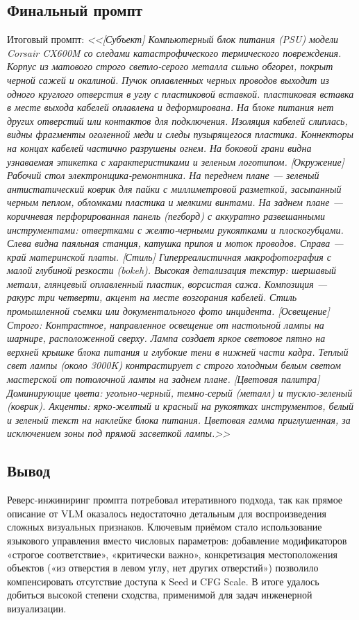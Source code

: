 \subsection{Финальный промпт}
Итоговый промпт: \textit{<<[Субъект]
Компьютерный блок питания (PSU) модели Corsair CX600M со следами катастрофического термического повреждения. Корпус из матового строго светло-серого металла сильно обгорел, покрыт черной сажей и окалиной. Пучок оплавленных черных проводов выходит из одного круглого отверстия в углу с пластиковой вставкой. пластиковая вставка в месте выхода кабелей оплавлена и деформирована. На блоке питания нет других отверстий или контактов для подключения. Изоляция кабелей слиплась, видны фрагменты оголенной меди и следы пузырящегося пластика. Коннекторы на концах кабелей частично разрушены огнем. На боковой грани видна узнаваемая этикетка с характеристиками и зеленым логотипом.
[Окружение]
Рабочий стол электронщика-ремонтника. На переднем плане — зеленый антистатический коврик для пайки с миллиметровой разметкой, засыпанный черным пеплом, обломками пластика и мелкими винтами. На заднем плане — коричневая перфорированная панель (пегборд) с аккуратно развешанными инструментами: отвертками с желто-черными рукоятками и плоскогубцами. Слева видна паяльная станция, катушка припоя и моток проводов. Справа — край материнской платы.
[Стиль]
Гиперреалистичная макрофотография с малой глубиной резкости (bokeh). Высокая детализация текстур: шершавый металл, глянцевый оплавленный пластик, ворсистая сажа. Композиция — ракурс три четверти, акцент на месте возгорания кабелей. Стиль промышленной съемки или документального фото инцидента.
[Освещение]
Строго: Контрастное, направленное освещение от настольной лампы на шарнире, расположенной сверху. Лампа создает яркое световое пятно на верхней крышке блока питания и глубокие тени в нижней части кадра. Теплый свет лампы (около 3000K) контрастирует с строго холодным белым светом мастерской от потолочной лампы на заднем плане.
[Цветовая палитра]
Доминирующие цвета: угольно-черный, темно-серый (металл) и тускло-зеленый (коврик). Акценты: ярко-желтый и красный на рукоятках инструментов, белый и зеленый текст на наклейке блока питания. Цветовая гамма приглушенная, за исключением зоны под прямой засветкой лампы.>>}
\subsection{Вывод}
Реверс-инжиниринг промпта потребовал итеративного подхода, так как прямое описание от VLM оказалось недостаточно детальным для воспроизведения сложных визуальных признаков. Ключевым приёмом стало использование языкового управления вместо числовых параметров: добавление модификаторов «строгое соответствие», «критически важно», конкретизация местоположения объектов («из отверстия в левом углу, нет других отверстий») позволило компенсировать отсутствие доступа к Seed и CFG Scale. В итоге удалось добиться высокой степени сходства, применимой для задач инженерной визуализации.